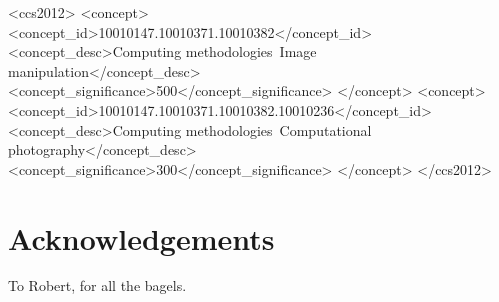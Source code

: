 \documentclass{acmsiggraph}
\begin{document}
\maketitle


\linenumbers

%
%
\begin{CCSXML}
<ccs2012>
<concept>
<concept_id>10010147.10010371.10010382</concept_id>
<concept_desc>Computing methodologies~Image manipulation</concept_desc>
<concept_significance>500</concept_significance>
</concept>
<concept>
<concept_id>10010147.10010371.10010382.10010236</concept_id>
<concept_desc>Computing methodologies~Computational photography</concept_desc>
<concept_significance>300</concept_significance>
</concept>
</ccs2012>
\end{CCSXML}


\keywordlist

\conceptlist

\printcopyright








\section*{Acknowledgements}

To Robert, for all the bagels.


\nocite{*}

\end{document}
